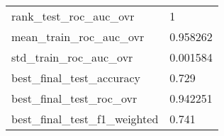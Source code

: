 \begin{tabular}{ll}
rank\_test\_roc\_auc\_ovr       &                                                  1 \\
mean\_train\_roc\_auc\_ovr      &                                           0.958262 \\
std\_train\_roc\_auc\_ovr       &                                           0.001584 \\
best\_final\_test\_accuracy    &                                              0.729 \\
best\_final\_test\_roc\_ovr     &                                           0.942251 \\
best\_final\_test\_f1\_weighted &                                              0.741 \\
\bottomrule
\end{tabular}
